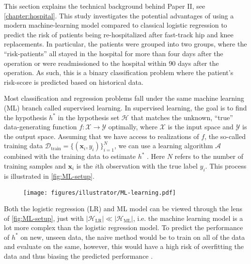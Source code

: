 
This section explains the technical background behind Paper II, see \autoref{chapter:hospital}. This study investigates the potential advantages of using a modern machine-learning model compared to classical logistic regression to predict the risk of patients being re-hospitalized after fast-track hip and knee replacements. In particular, the patients were grouped into two groups, where the ``risk-patients'' all stayed in the hospital for more than four days after the operation or were readmissioned to the hospital within 90 days after the operation. As such, this is a binary classification problem where the patient's risk-score is predicted based on historical data.

Most classification and regression problems fall under the same machine learning (ML) branch called supervised learning. In supervised learning, the goal is to find the hypothesis $h^*$ in the hypothesis set $\mathcal{H}$ that matches the unknown, ``true'' data-generating function $f: \mathcal{X} \rightarrow \mathcal{Y}$ optimally, where $\mathcal{X}$ is the input space and $\mathcal{Y}$ is the output space. Assuming that we have access to realizations of $f$, the so-called training data $\mathcal{D}_\mathrm{train} = \{(\mathbf{x}_i, y_i)\}_{i=1}^N$, we can use a learning algorithm $\mathcal{A}$ combined with the training data to estimate $h^*$ \autocite{abu-mostafaLearningData2012a}. Here $N$ refers to the number of training samples and $\mathbf{x}_i$ is the $i$th observation with the true label $y_i$. This process is illustrated in \autoref{fig:ML-setup}.

\begin{figure}[htbp]
    \centering
    \texttt{[image: figures/illustrator/ML-learning.pdf]}
\end{figure}

Both the logistic regression (LR) and ML model can be viewed through the lens of \autoref{fig:ML-setup}, just with $|\mathcal{H}_\mathrm{LR}| \ll |\mathcal{H}_\mathrm{ML}|$, i.e. the machine learning model is a lot more complex than the logistic regression model. To predict the performance of $h^*$ on new, unseen data, the naive method would be to train on all of the data and evaluate on the same, however, this would have a high risk of overfitting the data and thus biasing the predicted performance \autocite{abu-mostafaLearningData2012a}.

